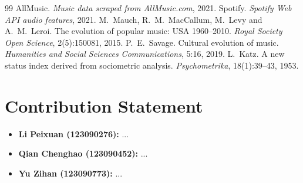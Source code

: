 \documentclass[11pt,letterpaper]{article}
\numberwithin{equation}{section}
\begin{document}
\newpage
\begin{thebibliography}{99}
 AllMusic. \emph{Music data scraped from AllMusic.com}, 2021.
 Spotify. \emph{Spotify Web API audio features}, 2021.
  M.~Mauch, R.~M.~MacCallum, M.~Levy and A.~M.~Leroi.
  The evolution of popular music: USA 1960--2010.
  \emph{Royal Society Open Science}, 2(5):150081, 2015.
  P.~E.~Savage.
  Cultural evolution of music.
  \emph{Humanities and Social Sciences Communications}, 5:16, 2019.
  L.~Katz.
  A new status index derived from sociometric analysis.
  \emph{Psychometrika}, 18(1):39--43, 1953.
\end{thebibliography}

\newpage
\section*{Contribution Statement}
\begin{itemize}
  \item \textbf{Li Peixuan (123090276):} ...
  \item \textbf{Qian Chenghao (123090452):} ...
  \item \textbf{Yu Zihan (123090773):} ...
\end{itemize}
\end{document}
